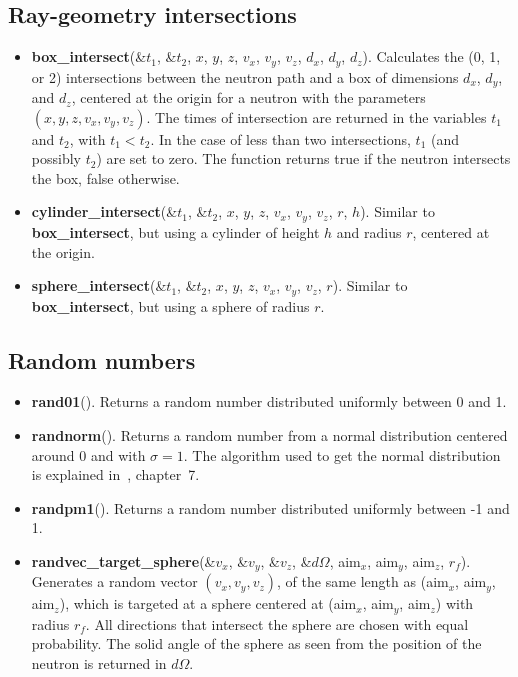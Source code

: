 \subsection{Ray-geometry intersections}
\begin{itemize}
\item {\bf box\_intersect}(\&$t_1$, \&$t_2$, $x$, $y$, $z$, $v_x$, $v_y$, $v_z$,
  $d_x$, $d_y$, $d_z$). Calculates the (0, 1, or 2) intersections between
  the neutron path and a box of dimensions $d_x$, $d_y$, and $d_z$,
  centered at the origin for a neutron with the parameters
  $(x,y,z,v_x,v_y,v_z)$. The times of intersection are returned
  in the variables $t_1$ and $t_2$, with $t_1 < t_2$. In the case
  of less than two intersections, $t_1$ (and possibly $t_2$) are set to
  zero. The function returns true if the neutron intersects the box,
  false otherwise.
\item {\bf cylinder\_intersect}(\&$t_1$, \&$t_2$, $x$, $y$, $z$, $v_x$, $v_y$, $v_z$,
  $r$, $h$).  Similar to {\bf box\_intersect}, but using a cylinder of height $h$ and radius $r$,
  centered at the origin.
\item {\bf sphere\_intersect}(\&$t_1$, \&$t_2$, $x$, $y$, $z$, $v_x$, $v_y$, $v_z$,
  $r$). Similar to {\bf box\_intersect}, but using a sphere
  of radius $r$. 
\end{itemize}

\subsection{Random numbers}
\begin{itemize}
\item {\bf rand01}(). Returns a random number distributed uniformly between 0 and 1.
\item {\bf randnorm}(). Returns a random number from a normal
  distribution centered around 0 and with $\sigma=1$. The algorithm used to
  get the normal distribution is explained in~\cite{num_rep}, chapter~7.
\item {\bf randpm1}(). Returns a random number distributed uniformly between -1 and 1.
\item {\bf randvec\_target\_sphere}(\&$v_x$, \&$v_y$, \&$v_z$, \&$d\Omega$,
  aim$_x$, aim$_y$, aim$_z$, $r_f$).
  Generates a random vector $(v_x, v_y, v_z)$, of the same
  length as (aim$_x$, aim$_y$, aim$_z$),
  which is targeted at a sphere centered at (aim$_x$, aim$_y$, aim$_z$)
  with radius $r_f$. All directions that intersect the sphere are chosen
  with equal probability. The solid angle of the sphere as seen from the
  position of the neutron is returned in $d\Omega$.
\end{itemize}

